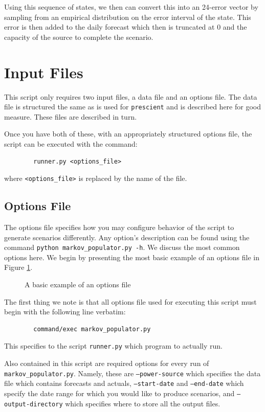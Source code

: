 \documentclass[11pt]{article}
\begin{document}
	Using this sequence of states, we then can convert this into an 24-error 
	vector by sampling from an empirical distribution on the error interval of
	the state. This error is then added to the daily forecast which then is
	truncated at 0 and the capacity of the source to complete the scenario.
	
	\section{Input Files}
	This script only requires two input files, a data file and an options file.
	The data file is structured the same as is used for \texttt{prescient} and
	is described here for good measure.
	These files are described in turn.
	
	Once you have both of these, with an appropriately structured options file,
	the script can be executed with the command:
	\begin{verbatim}
		runner.py <options_file>
	\end{verbatim}
	where \texttt{<options\_file>} is replaced by the name of the file.
	
	
		
	\subsection{Options File}
	The options file specifies how you may configure behavior of the script to
	generate scenarios differently. Any option's description can be found using 
	the command \texttt{python markov\_populator.py -h}. We discuss the most
	common options here. We begin by presenting the most basic
	example of an options file in Figure \ref{example1}.
	
	\begin{figure}[H]
	\begin{framed}
		
	\end{framed}
	\label{example1}
	\caption{A basic example of an options file}
	\end{figure}
	
	The first thing we note is that all options file used for executing this
	script must begin with the following line verbatim:
	\begin{verbatim}
		command/exec markov_populator.py
	\end{verbatim}
	This specifies to the script \texttt{runner.py} which program to actually
	run.
	
	Also contained in this script are required options for every run of 
	\texttt{markov\_populator.py}. Namely, these are \texttt{--power-source}
	which specifies the data file which contains forecasts and actuals, 
	\texttt{--start-date} and \texttt{--end-date} which specify the date range
	for which you would like to produce scenarios, and 
	\texttt{--output-directory} which specifies where to store all the output
	files.
	
\end{document}
